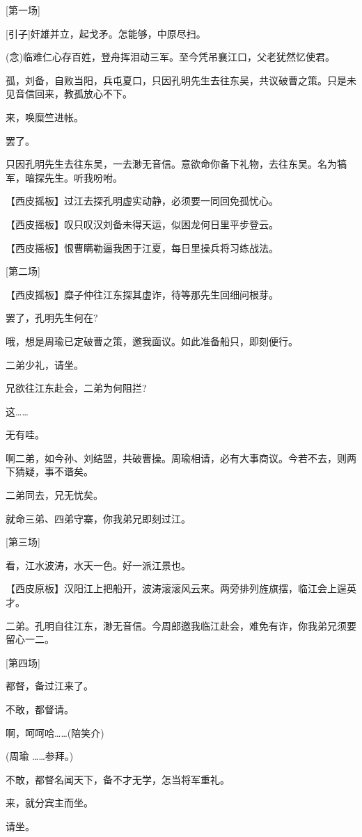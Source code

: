 {[}第一场{]}

{[}引子{]}奸雄并立，起戈矛。怎能够，中原尽扫。

(念)临难仁心存百姓，登舟挥泪动三军。至今凭吊襄江口，父老犹然忆使君。

孤，刘备，自败当阳，兵屯夏口，只因孔明先生去往东吴，共议破曹之策。只是未见音信回来，教孤放心不下。

来，唤糜竺进帐。

罢了。

只因孔明先生去往东吴，一去渺无音信。意欲命你备下礼物，去往东吴。名为犒军，暗探先生。听我吩咐。

【西皮摇板】过江去探孔明虚实动静，必须要一同回免孤忧心。

【西皮摇板】叹只叹汉刘备未得天运，似困龙何日里平步登云。

【西皮摇板】恨曹瞒勒逼我困于江夏，每日里操兵将习练战法。

{[}第二场{]}

【西皮摇板】糜子仲往江东探其虚诈，待等那先生回细问根芽。

罢了，孔明先生何在?

哦，想是周瑜已定破曹之策，邀我面议。如此准备船只，即刻便行。

二弟少礼，请坐。

兄欲往江东赴会，二弟为何阻拦?

这\ldots{}\ldots{}

无有哇。

啊二弟，如今孙、刘结盟，共破曹操。周瑜相请，必有大事商议。今若不去，则两下猜疑，事不谐矣。

二弟同去，兄无忧矣。

就命三弟、四弟守寨，你我弟兄即刻过江。

{[}第三场{]}

看，江水波涛，水天一色。好一派江景也。

【西皮原板】汉阳江上把船开，波涛滚滚风云来。两旁排列旌旗摆，临江会上逞英才。

二弟。孔明自往江东，渺无音信。今周郎邀我临江赴会，难免有诈，你我弟兄须要留心一二。

{[}第四场{]}

都督，备过江来了。

不敢，都督请。

啊，呵呵哈\ldots{}\ldots{}(陪笑介)

(周瑜 \ldots{}\ldots{}参拜。)

不敢，都督名闻天下，备不才无学，怎当将军重礼。

来，就分宾主而坐。

请坐。

